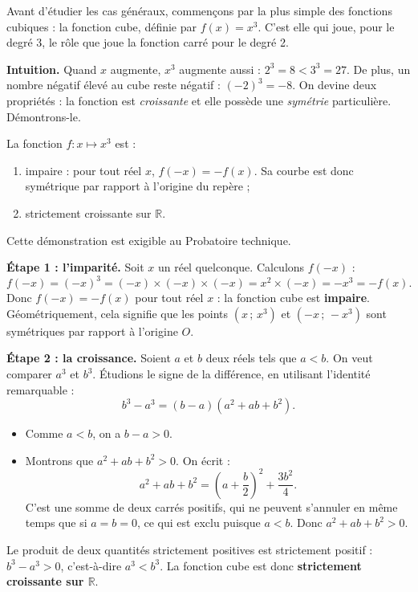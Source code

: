 \documentclass[11pt]{article}
\newcommand{\cle}[1]{{\popxbold\color{popdark}#1}}
\newcounter{popsec}
\newcounter{popsub}
\newcommand{\courssub}[1]{%
  \stepcounter{popsub}%
  \par\vspace{9pt}\noindent{\popxbold\fontsize{11.5}{13}\selectfont\color{popink}{\color{poporange}\thepopsec.\thepopsub}\hspace{6pt}#1}\par\nopagebreak\vspace{4pt}
}
\begin{document}
\courssub{La fonction de référence : $x \mapsto x^3$}

Avant d'étudier les cas généraux, commençons par la plus simple des fonctions cubiques : la \cle{fonction cube}, définie par $f(x) = x^3$. C'est elle qui joue, pour le degré 3, le rôle que joue la fonction carré pour le degré 2.

\textbf{Intuition.} Quand $x$ augmente, $x^3$ augmente aussi : $2^3 = 8 < 3^3 = 27$. De plus, un nombre négatif élevé au cube reste négatif : $(-2)^3 = -8$. On devine deux propriétés : la fonction est \emph{croissante} et elle possède une \emph{symétrie} particulière. Démontrons-le.

\begin{propriete}
La fonction $f : x \mapsto x^3$ est :
\begin{enumerate}
\item \cle{impaire} : pour tout réel $x$, $f(-x) = -f(x)$. Sa courbe est donc symétrique par rapport à l'origine du repère ;
\item \cle{strictement croissante} sur $\mathbb{R}$.
\end{enumerate}
Cette démonstration est exigible au Probatoire technique.
\end{propriete}

\begin{experience}
\textbf{Étape 1 : l'imparité.} Soit $x$ un réel quelconque. Calculons $f(-x)$ :
\[ f(-x) = (-x)^3 = (-x) \times (-x) \times (-x) = x^2 \times (-x) = -x^3 = -f(x). \]
Donc $f(-x) = -f(x)$ pour tout réel $x$ : la fonction cube est \textbf{impaire}. Géométriquement, cela signifie que les points $(x\,;\,x^3)$ et $(-x\,;\,-x^3)$ sont symétriques par rapport à l'origine $O$.

\textbf{Étape 2 : la croissance.} Soient $a$ et $b$ deux réels tels que $a < b$. On veut comparer $a^3$ et $b^3$. Étudions le signe de la différence, en utilisant l'identité remarquable :
\[ b^3 - a^3 = (b - a)(a^2 + ab + b^2). \]
\begin{itemize}
\item Comme $a < b$, on a $b - a > 0$.
\item Montrons que $a^2 + ab + b^2 > 0$. On écrit :
\[ a^2 + ab + b^2 = \left(a + \frac{b}{2}\right)^2 + \frac{3b^2}{4}. \]
C'est une somme de deux carrés positifs, qui ne peuvent s'annuler en même temps que si $a = b = 0$, ce qui est exclu puisque $a < b$. Donc $a^2 + ab + b^2 > 0$.
\end{itemize}
Le produit de deux quantités strictement positives est strictement positif : $b^3 - a^3 > 0$, c'est-à-dire $a^3 < b^3$. La fonction cube est donc \textbf{strictement croissante sur $\mathbb{R}$}.
\end{experience}
\end{document}
